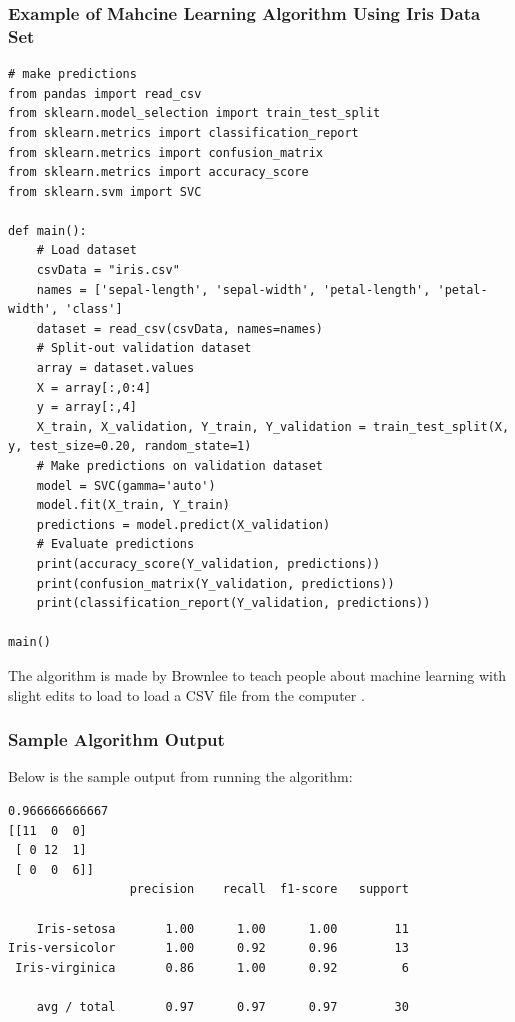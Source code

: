 \documentclass{beamer}
\begin{document}
\begin{frame}[fragile]
\frametitle{Example of Mahcine Learning Algorithm Using Iris Data Set}
\fontsize{6}{5}
\begin{verbatim}
# make predictions
from pandas import read_csv
from sklearn.model_selection import train_test_split
from sklearn.metrics import classification_report
from sklearn.metrics import confusion_matrix
from sklearn.metrics import accuracy_score
from sklearn.svm import SVC

def main():
    # Load dataset
    csvData = "iris.csv"
    names = ['sepal-length', 'sepal-width', 'petal-length', 'petal-width', 'class']
    dataset = read_csv(csvData, names=names)
    # Split-out validation dataset
    array = dataset.values
    X = array[:,0:4]
    y = array[:,4]
    X_train, X_validation, Y_train, Y_validation = train_test_split(X, y, test_size=0.20, random_state=1)
    # Make predictions on validation dataset
    model = SVC(gamma='auto')
    model.fit(X_train, Y_train)
    predictions = model.predict(X_validation)
    # Evaluate predictions
    print(accuracy_score(Y_validation, predictions))
    print(confusion_matrix(Y_validation, predictions))
    print(classification_report(Y_validation, predictions))

main()
\end{verbatim}
The algorithm is made by Brownlee to teach people about machine learning with slight edits to load to load a CSV file from the computer \cite{MLAlg}.
\end{frame}

\begin{frame}[fragile]
\frametitle{Sample Algorithm Output}
Below is the sample output from running the algorithm:
\begin{verbatim}
0.966666666667
[[11  0  0]
 [ 0 12  1]
 [ 0  0  6]]
                 precision    recall  f1-score   support

    Iris-setosa       1.00      1.00      1.00        11
Iris-versicolor       1.00      0.92      0.96        13
 Iris-virginica       0.86      1.00      0.92         6

    avg / total       0.97      0.97      0.97        30

\end{verbatim}
\end{frame}
\end{document}
